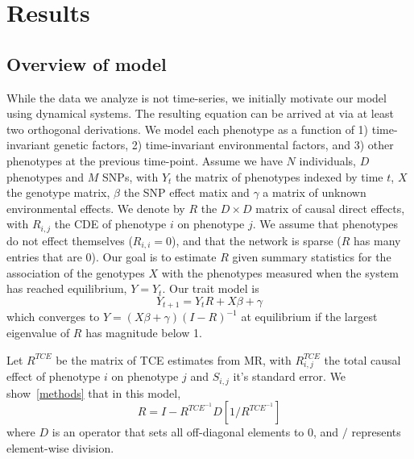 \documentclass{article}
\begin{document}
\section{Results}
\subsection{Overview of model}

While the data we analyze is not time-series, we initially motivate our model using dynamical systems. 
The resulting equation can be arrived at via at least two orthogonal derivations. 
We model each phenotype as a function of 1) time-invariant genetic factors, 2)
time-invariant environmental factors, and 3) other phenotypes at the previous
time-point.
Assume we have $N$ individuals, $D$ phenotypes and $M$ SNPs,
with $Y_t$ the matrix of phenotypes indexed by time $t$, $X$ the genotype
matrix, $\beta$ the SNP effect matix and $\gamma$ a matrix of unknown
environmental effects. We denote by $R$ the $D \times D$ matrix of
causal direct effects, with $R_{i, j}$ the CDE of phenotype $i$ on
phenotype $j$. We assume that phenotypes do not effect themselves ($R_{i,i} = 0$),
and that the network is sparse ($R$ has many entries that are $0$).
Our goal is to estimate $R$ given summary statistics
 for the association of the genotypes $X$ with the phenotypes measured when
 the system has reached equilibrium, $Y = Y_{t}$.
 Our trait model is
\begin{equation}
Y_{t+1} = Y_{t} R + X\beta + \gamma
\end{equation}
which converges to $Y = (X\beta + \gamma)(I-R)^{-1}$ at equilibrium if the largest eigenvalue
of $R$ has magnitude below 1.

Let $R^{TCE}$ be the matrix of TCE estimates from MR, with $R^{TCE}_{i,j}$ the total
causal effect of phenotype $i$ on phenotype $j$ and $S_{i,j}$ it's standard error.
We show~\ref{methods} that
in this model,
\begin{equation}\label{r_cde_main}
R = I - R^{TCE^{-1}} D[1 / R^{TCE^{-1}}]
\end{equation}
where $D$ is an operator that sets all off-diagonal elements to 0, and $/$
represents element-wise division.
\end{document}
